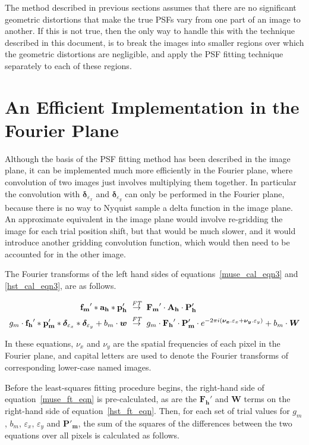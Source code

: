 \documentclass[12pt,twoside,a4paper]{article}
\newcommand{\ftarrow}{\stackrel{\mbox{\scriptsize\it FT}}{\rightarrow}}
\newcommand{\mepsf}{\mathbf{p'_m}}
\newcommand{\hepsf}{\mathbf{p'_h}}
\newcommand{\Mepsf}{\mathbf{P'_m}}
\newcommand{\Hepsf}{\mathbf{P'_h}}
\newcommand{\hlpf}{\mathbf{a_h}}
\newcommand{\Hlpf}{\mathbf{A_h}}
\newcommand{\mimg}{\mathbf{f_m}}
\newcommand{\himg}{\mathbf{f_h}}
\newcommand{\Mimg}{\mathbf{F_m}}
\newcommand{\Himg}{\mathbf{F_h}}
\newcommand{\mdx}{\bm{\delta}_{\dx}}
\newcommand{\mdy}{\bm{\delta}_{\dy}}
\newcommand{\Mdxy}{e^{-2\pi i(\bm{\nu_x}.\varepsilon_x + \bm{\nu_y}.\varepsilon_y)}}
\newcommand{\dx}{\varepsilon_x}
\newcommand{\dy}{\varepsilon_y}
\newcommand{\wt}{\bm{w}}
\newcommand{\Wt}{\bm{W}}
\newcommand{\mgain}{g_m}
\newcommand{\mbg}{b_m}
\begin{document}
The method described in previous sections assumes that there are no
significant geometric distortions that make the true PSFs vary from
one part of an image to another. If this is not true, then the only
way to handle this with the technique described in this document, is
to break the images into smaller regions over which the geometric
distortions are negligible, and apply the PSF fitting technique
separately to each of these regions.

\section{An Efficient Implementation in the Fourier Plane}

Although the basis of the PSF fitting method has been described in the
image plane, it can be implemented much more efficiently in the
Fourier plane, where convolution of two images just involves
multiplying them together. In particular the convolution with $\mdx$
and $\mdy$ can only be performed in the Fourier plane, because there
is no way to Nyquist sample a delta function in the image plane. An
approximate equivalent in the image plane would involve re-gridding
the image for each trial position shift, but that would be much
slower, and it would introduce another gridding convolution function,
which would then need to be accounted for in the other image.

The Fourier transforms of the left hand sides of
equations~\ref{muse_cal_eqn3} and \ref{hst_cal_eqn3}, are as
follows.

\begin{align}
\label{muse_ft_eqn}
\mimg' \ast \hlpf \ast \hepsf \ &\ftarrow\  \Mimg' \cdot \Hlpf \cdot
\Hepsf\\
\label{hst_ft_eqn}
\mgain \cdot \himg' \ast \mepsf \ast \mdx \ast \mdy + \mbg\cdot\wt
\ &\ftarrow\  \mgain\cdot \Himg' \cdot \Mepsf \cdot \Mdxy + \mbg\cdot\Wt
\end{align}

In these equations, $\nu_x$ and $\nu_y$ are the spatial frequencies of
each pixel in the Fourier plane, and capital letters are used to
denote the Fourier transforms of corresponding lower-case named
images.

Before the least-squares fitting procedure begins, the right-hand side
of equation~\ref{muse_ft_eqn} is pre-calculated, as are the $\Himg'$
and $\Wt$ terms on the right-hand side of
equation~\ref{hst_ft_eqn}. Then, for each set of trial values for
$\mgain$, $\mbg$, $\dx$, $\dy$ and $\Mepsf$, the sum of the squares of
the differences between the two equations over all pixels is
calculated as follows.
\end{document}
